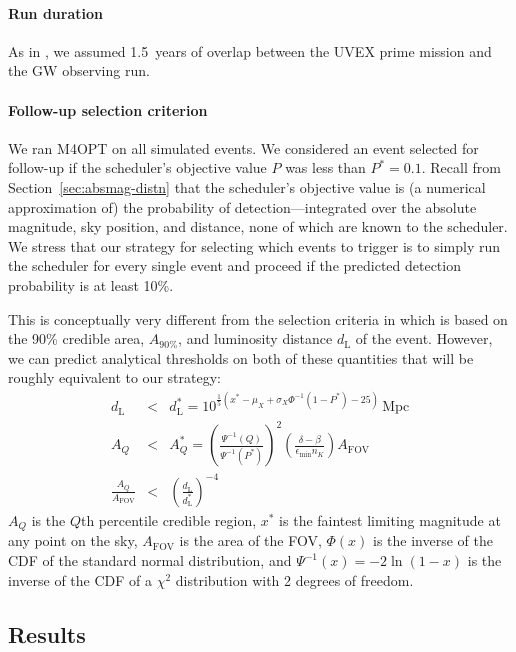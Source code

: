\documentclass[twocolumn,times]{aastex631}
\begin{document}
\paragraph{Run duration}
As in \citet{2025arXiv250114109C}, we assumed 1.5~years of overlap between the \ac{UVEX} prime mission and the \ac{GW} observing run.

\paragraph{Follow-up selection criterion}
We ran \ac{M4OPT} on all simulated events. We considered an event selected for follow-up if the scheduler's objective value $P$ was less than $P^* = 0.1$. Recall from Section~\ref{sec:absmag-distn} that the scheduler's objective value is (a numerical approximation of) the probability of detection---integrated over the absolute magnitude, sky position, and distance, none of which are known to the scheduler. We stress that our strategy for selecting which events to trigger is to simply run the scheduler for every single event and proceed if the predicted detection probability is at least 10\%.

This is conceptually very different from the selection criteria in \citet{2025arXiv250114109C} which is based on the 90\% credible area, $A_\mathrm{90\%}$, and luminosity distance $d_\mathrm{L}$ of the event. However, we can predict analytical thresholds on both of these quantities that will be roughly equivalent to our strategy:
%
\begin{eqnarray}
    d_\mathrm{L} &<& d_\mathrm{L}^* = 10^{\frac{1}{5}(x^* - \mu_X + \sigma_X \Phi^{-1}(1-P^*) - 25)}\,\mathrm{Mpc} \label{eq:threshold-distance} \\
    A_Q &<& A_Q^* = \left(\frac{\Psi^{-1}(Q)}{\Psi^{-1}(P^*)}\right)^2 \left(\frac{\delta - \beta}{\epsilon_\mathrm{min} n_K}\right)A_\mathrm{FOV} \label{eq:threshold-area} \\
    \frac{A_Q}{A_\mathrm{FOV}} &<& \left(\frac{d_\mathrm{L}}{d_\mathrm{L}^*}\right)^{-4} \label{eq:threshold-area-distance}
\end{eqnarray}
%
$A_Q$ is the $Q$th percentile credible region, $x^*$ is the faintest limiting magnitude at any point on the sky, $A_\mathrm{FOV}$ is the area of the \ac{FOV}, $\Phi(x)$ is the inverse of the \ac{CDF} of the standard normal distribution, and $\Psi^{-1}(x) = -2\ln(1 - x)$ is the inverse of the \ac{CDF} of a $\chi^2$ distribution with 2 degrees of freedom.

\subsection{Results}
\end{document}
